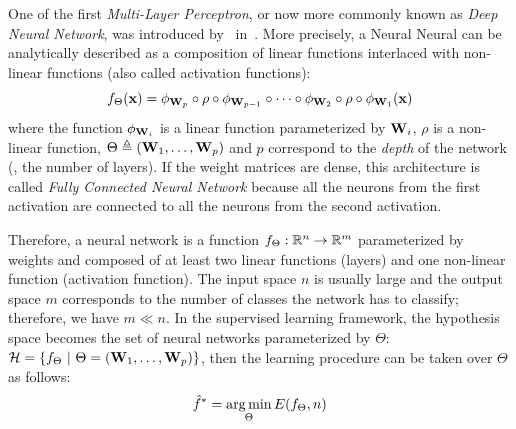 One of the first \emph{Multi-Layer Perceptron}, or now more commonly known as \emph{Deep Neural Network}, was introduced by~\citeauthor{ivakhnenko1967cybernetics} in~\citeyear{ivakhnenko1967cybernetics}.
More precisely, a Neural Neural can be analytically described as a composition of linear functions interlaced with non-linear functions (also called activation functions):
\begin{equation}
  f_\Theta(\mathbf{x}) = \phi_{\mathbf{W}_p} \circ \rho \circ \phi_{\mathbf{W}_{p-1}} \circ \cdots \circ \phi_{\mathbf{W}_2} \circ \rho \circ \phi_{\mathbf{W}_1}(\mathbf{x})
  \label{equation:neural_network}
\end{equation}
where the function $\phi_{\mathbf{W}_i}$ is a linear function parameterized by $\mathbf{W}_i$, $\rho$ is a non-linear function, $\Theta \triangleq ( \mathbf{W}_1, \dots, \mathbf{W}_p )$ and $p$ correspond to the \emph{depth} of the network (\ie, the number of layers).
If the weight matrices are dense, this architecture is called \emph{Fully Connected Neural Network} because all the neurons from the first activation are connected to all the neurons from the second activation.

Therefore, a neural network is a function $f_\Theta:\mathbb{R}^n \rightarrow \mathbb{R}^m$ parameterized by weights and composed of at least two linear functions (layers) and one non-linear function (activation function).
The input space $n$ is usually large and the output space $m$ corresponds to the number of classes the network has to classify; therefore, we have $m \ll n$.
In the supervised learning framework, the hypothesis space becomes the set of neural networks parameterized by $\Theta$: $\mathcal{H} = \left\{ f_\Theta \ |\ \Theta = ( \Wmat_1, \dots, \Wmat_p ) \right\}$,
then the learning procedure can be taken over $\Theta$ as follows:
\begin{equation}
  \hat{f}^* = \operatorname*{arg\,min}_{\Theta} E(f_\Theta, n) 
\end{equation}




